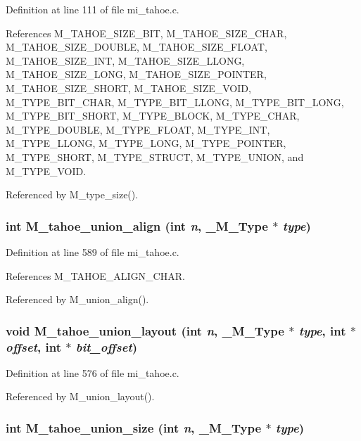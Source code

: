 Definition at line 111 of file mi\_\-tahoe.c.

References M\_\-TAHOE\_\-SIZE\_\-BIT, M\_\-TAHOE\_\-SIZE\_\-CHAR, M\_\-TAHOE\_\-SIZE\_\-DOUBLE, M\_\-TAHOE\_\-SIZE\_\-FLOAT, M\_\-TAHOE\_\-SIZE\_\-INT, M\_\-TAHOE\_\-SIZE\_\-LLONG, M\_\-TAHOE\_\-SIZE\_\-LONG, M\_\-TAHOE\_\-SIZE\_\-POINTER, M\_\-TAHOE\_\-SIZE\_\-SHORT, M\_\-TAHOE\_\-SIZE\_\-VOID, M\_\-TYPE\_\-BIT\_\-CHAR, M\_\-TYPE\_\-BIT\_\-LLONG, M\_\-TYPE\_\-BIT\_\-LONG, M\_\-TYPE\_\-BIT\_\-SHORT, M\_\-TYPE\_\-BLOCK, M\_\-TYPE\_\-CHAR, M\_\-TYPE\_\-DOUBLE, M\_\-TYPE\_\-FLOAT, M\_\-TYPE\_\-INT, M\_\-TYPE\_\-LLONG, M\_\-TYPE\_\-LONG, M\_\-TYPE\_\-POINTER, M\_\-TYPE\_\-SHORT, M\_\-TYPE\_\-STRUCT, M\_\-TYPE\_\-UNION, and M\_\-TYPE\_\-VOID.

Referenced by M\_\-type\_\-size().
\subsubsection{\setlength{\rightskip}{0pt plus 5cm}int M\_\-tahoe\_\-union\_\-align (int {\em n}, \bf{\_\-M\_\-Type} $\ast$ {\em type})}\label{mi__tahoe_8c_c0c978cc4f5ad66c56c1c889a93ba8af}




Definition at line 589 of file mi\_\-tahoe.c.

References M\_\-TAHOE\_\-ALIGN\_\-CHAR.

Referenced by M\_\-union\_\-align().
\subsubsection{\setlength{\rightskip}{0pt plus 5cm}void M\_\-tahoe\_\-union\_\-layout (int {\em n}, \bf{\_\-M\_\-Type} $\ast$ {\em type}, int $\ast$ {\em offset}, int $\ast$ {\em bit\_\-offset})}\label{mi__tahoe_8c_f222120dd33a020d9109be846e2fe686}




Definition at line 576 of file mi\_\-tahoe.c.

Referenced by M\_\-union\_\-layout().
\subsubsection{\setlength{\rightskip}{0pt plus 5cm}int M\_\-tahoe\_\-union\_\-size (int {\em n}, \bf{\_\-M\_\-Type} $\ast$ {\em type})}\label{mi__tahoe_8c_12cc409b38378a099466730bf3e3679b}




